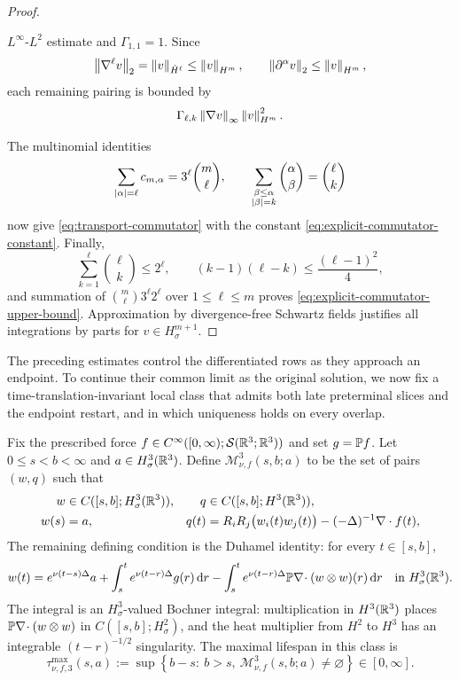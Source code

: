 \begin{proof}
\begin{samepage}
\(L^\infty\)-\(L^2\) estimate and \(\Gamma_{1,1}=1\).  Since
\[
 \left\lVert \nabla^\ell v\right\rVert_2=\left\lVert v\right\rVert_{\dot H^\ell}\le\left\lVert v\right\rVert_{H^m},
 \qquad
 \left\lVert \partial^\alpha v\right\rVert_2\le\left\lVert v\right\rVert_{H^m},
\]
each remaining pairing is bounded by
\[
 \Gamma_{\ell,k}\left\lVert \nabla v\right\rVert_\infty\left\lVert v\right\rVert_{H^m}^2.
\]
\par
\end{samepage}
The multinomial identities
\[
 \sum_{\left|\alpha\right|=\ell}c_{m,\alpha}
 =3^\ell\binom m\ell,
 \qquad
 \sum_{\substack{\beta\le\alpha\\\left|\beta\right|=k}}
 \binom\alpha\beta=\binom\ell k
\]
now give \eqref{eq:transport-commutator} with the constant
\eqref{eq:explicit-commutator-constant}.  Finally,
\[
 \sum_{k=1}^{\ell}\binom\ell k\le2^\ell,
 \qquad
 (k-1)(\ell-k)\le\frac{(\ell-1)^2}{4},
\]
and summation of
\(
 \binom m\ell3^\ell2^\ell
\)
over \(1\le\ell\le m\) proves
\eqref{eq:explicit-commutator-upper-bound}.  Approximation by divergence-free
Schwartz fields justifies all integrations by parts for
\(v\in H^{m+1}_\sigma\).
\end{proof}

The preceding estimates control the differentiated rows as they approach an
endpoint.  To continue their common limit as the original solution, we now fix a
time-translation-invariant local class that admits both late preterminal
slices and the endpoint restart, and in which uniqueness holds on every
overlap.

\begin{definition}
\label{def:shifted-normalized-H3-mild-class}
Fix the prescribed force
\(f\in C^\infty([0,\infty);\mathcal S(\mathbb R^3;\mathbb R^3))\) and set
\(g=\mathbb P f\).  Let \(0\le s<b<\infty\) and
\(a\in H^3_\sigma(\mathbb R^3)\).  Define
\(\mathscr M_{\nu,f}^3(s,b;a)\) to be the set of pairs \((w,q)\) such that
\begin{align}
 w&\in C([s,b];H^3_\sigma(\mathbb R^3)),
 &q&\in C([s,b];H^3(\mathbb R^3)),
 \label{eq:shifted-mild-class-spaces}\\
 w(s)&=a,
 &q(t)&=R_iR_j\bigl(w_i(t)w_j(t)\bigr)
 -(-\Delta)^{-1}\nabla\cdot f(t),
 \label{eq:shifted-mild-class-datum-pressure}
\end{align}
The remaining defining condition is the Duhamel identity: for every
\(t\in[s,b]\),
\begin{equation}
 w(t)=e^{\nu(t-s)\Delta}a
 +\int_s^t e^{\nu(t-r)\Delta}g(r)\,\mathrm d r
 -\int_s^t e^{\nu(t-r)\Delta}
 \mathbb P\nabla\!\cdot(w\otimes w)(r)\,\mathrm d r
 \quad\text{in }H^3_\sigma(\mathbb R^3).
 \label{eq:shifted-mild-class-duhamel}
\end{equation}
The integral is an \(H^3_\sigma\)-valued Bochner integral: multiplication in
\(H^3(\mathbb R^3)\) places
\(\mathbb P\nabla\!\cdot(w\otimes w)\) in \(C([s,b];H^2_\sigma)\), and the heat
multiplier from \(H^2\) to \(H^3\) has an integrable
\((t-r)^{-1/2}\) singularity.
The maximal lifespan in this class is
\begin{equation}
 \tau_{\nu,f,3}^{\max}(s,a)
 :=\sup\left\{b-s:\ b>s,\
 \mathscr M_{\nu,f}^3(s,b;a)\ne\varnothing\right\}\in[0,\infty].
 \label{eq:shifted-mild-maximal-lifespan}
\end{equation}
\end{definition}

